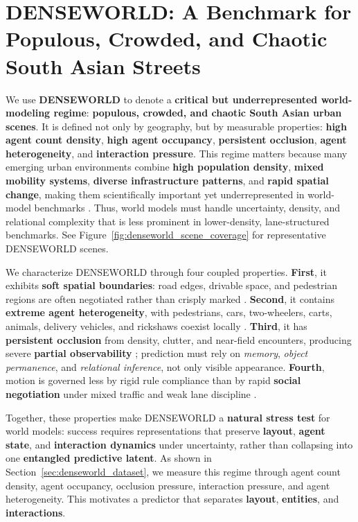 





\section{\textbf{DENSEWORLD}: A Benchmark for \textbf{Populous, Crowded, and Chaotic} South Asian Streets}

We use \textbf{DENSEWORLD} to denote a \textbf{critical but underrepresented world-modeling regime}: \textbf{populous, crowded, and chaotic South Asian urban scenes}. It is defined not only by geography, but by measurable properties: \textbf{high agent count density}, \textbf{high agent occupancy}, \textbf{persistent occlusion}, \textbf{agent heterogeneity}, and \textbf{interaction pressure}. This regime matters because many emerging urban environments combine \textbf{high population density}, \textbf{mixed mobility systems}, \textbf{diverse infrastructure patterns}, and \textbf{rapid spatial change}, making them scientifically important yet underrepresented in world-model benchmarks \cite{mahendra2021seven,ellis2016leveraging}. Thus, world models must handle uncertainty, density, and relational complexity that is less prominent in lower-density, lane-structured benchmarks. See Figure~\ref{fig:denseworld_scene_coverage} for representative DENSEWORLD scenes.



We characterize DENSEWORLD through four coupled properties. \textbf{First}, it exhibits \textbf{soft spatial boundaries}: road edges, drivable space, and pedestrian regions are often negotiated rather than crisply marked \cite{varma2019idd, dokania2023idd3d}. \textbf{Second}, it contains \textbf{extreme agent heterogeneity}, with pedestrians, cars, two-wheelers, carts, animals, delivery vehicles, and rickshaws coexist locally \cite{khan1999heterogeneous,asaithambi2012mixedtraffic}. \textbf{Third}, it has \textbf{persistent occlusion} from density, clutter, and near-field encounters, producing severe \textbf{partial observability} \cite{varma2019idd, dokania2023idd3d}; prediction must rely on \emph{memory}, \emph{object permanence}, and \emph{relational inference}, not only visible appearance. \textbf{Fourth}, motion is governed less by rigid rule compliance than by rapid \textbf{social negotiation} under mixed traffic and weak lane discipline \cite{papathanasopoulou2018weaklane,asaithambi2012mixedtraffic}.

Together, these properties make DENSEWORLD a \textbf{natural stress test} for world models: success requires representations that preserve \textbf{layout}, \textbf{agent state}, and \textbf{interaction dynamics} under uncertainty, rather than collapsing into one \textbf{entangled predictive latent}. As shown in Section~\ref{sec:denseworld_dataset}, we measure this regime through agent count density, agent occupancy, occlusion pressure, interaction pressure, and agent heterogeneity. This motivates a predictor that separates \textbf{layout}, \textbf{entities}, and \textbf{interactions}.


